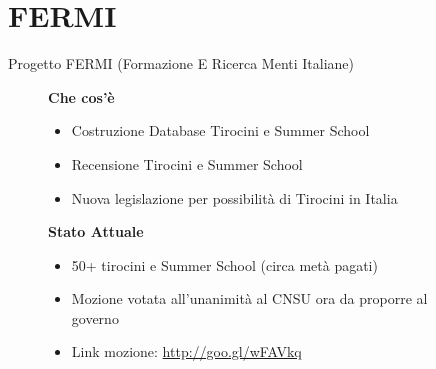 \documentclass{Bredelebeamer}
\begin{document}
\section{FERMI}
\begin{frame}{Progetto FERMI (Formazione E Ricerca Menti Italiane)}
\begin{figure}
\begin{block}{\centering \textbf{Che cos'è}}
\begin{itemize}
\item Costruzione Database Tirocini e Summer School
\item Recensione Tirocini e Summer School
\item Nuova legislazione per possibilità di Tirocini in Italia
\end{itemize}
\end{block}
\begin{block}{\centering \textbf{Stato Attuale}}
\begin{itemize}
\item 50+ tirocini e Summer School (circa metà pagati) 
\item Mozione votata all'unanimità al CNSU ora da proporre al governo
\item Link mozione: \href{http://www.cnsu.miur.it/argomenti/documentazione/mozioni/2016/mo_2016_03_03_005.aspx}{http://goo.gl/wFAVkq}
\end{itemize}
\end{block}
\end{figure}
\end{frame}
\end{document}
